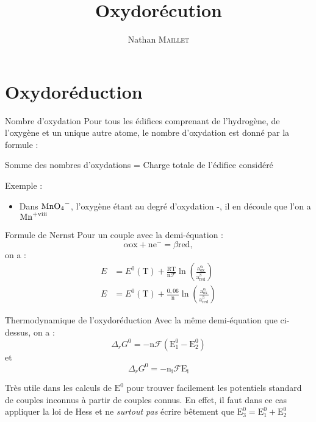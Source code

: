 \documentclass[french, a4paper, 11pt, twocolumn]{article}
\title{Oxydorécution}
\author{Nathan \textsc{Maillet}}
\date{}
\newcommand{\RNum}[1]{\uppercase\expandafter{\romannumeral #1\relax}}
\newcommand{\po}{\left(}         %
\newcommand{\pf}{\right)}        %
\newcommand{\pof}[1]{\po #1 \pf} %
\begin{document}
    \maketitle

    \section{Oxydoréduction}

    \begin{cadre}{Nombre d'oxydation}
        Pour tous les édifices comprenant de l'hydrogène, de l'oxygène et un unique autre atome, le nombre d'oxydation
        est donné par la formule :
        
        Somme des nombres d'oxydations = Charge totale de l'édifice considéré

        \tcblower
        Exemple :
        \begin{itemize}
            \item Dans \(\ce{MnO4-}\), l'oxygène étant au degré d'oxydation -\RNum{2},
            il en découle que l'on a \(\ce{Mn^{+\RNum{8}}}\) 
        \end{itemize}
    \end{cadre}

    \begin{cadre}{Formule de Nernst}
        Pour un couple avec la demi-équation :
        \[\alpha \mathrm{ox} + \mathrm{n} \mathrm{e^-} = \beta \mathrm{red},\] on a :
        \begin{align*}
            E &=E^0(\mathrm{T})+\frac{\mathrm{RT}}{\mathrm{n}\mathcal{F}}\ln\pof{\frac{\mathrm{a_{ox}^{\alpha}}}{\mathrm{a_{red}^{\beta}}}} \\
            E &=E^0(\mathrm{T})+\frac{0,06}{\mathrm{n}}\ln\pof{\frac{\mathrm{a_{ox}^{\alpha}}}{\mathrm{a_{red}^{\beta}}}}
        \end{align*}
    \end{cadre}

    \begin{cadre}{Thermodynamique de l'oxydoréduction}
        Avec la même demi-équation que ci-dessus, on a :
        \[\Delta_rG^0=-\mathrm{n}\mathcal{F}(\mathrm{E^0_1-E^0_2})\]
        et
        \[\Delta_rG^0=-\mathrm{n_i}\mathcal{F}\mathrm{E_i}\]

        \tcblower
        Très utile dans les calculs de \(\mathrm{E^0}\) pour trouver facilement les potentiels standard de couples inconnus
        à partir de couples connus. En effet, il faut dans ce cas appliquer la loi de Hess et ne \emph{surtout pas} écrire bêtement
        que \(\mathrm{E^0_3=E^0_1+E^0_2}\)
    \end{cadre}
\end{document}
